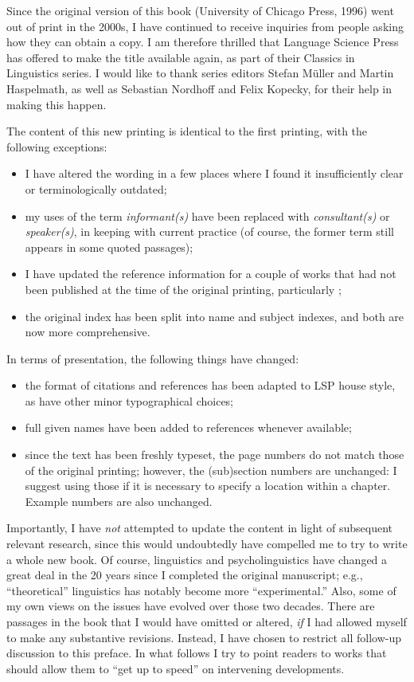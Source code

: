 \begin{refsection}
Since the original version of this book (University of Chicago Press, 1996) went out of print in the 2000s, I have continued to receive inquiries from people asking how they can obtain a copy. I am therefore thrilled that Language Science Press has offered to make the title available again, as part of their Classics in Linguistics series. I would like to thank series editors Stefan Müller and Martin Haspelmath, as well as Sebastian Nordhoff and Felix Kopecky, for their help in making this happen.

The content of this new printing is identical to the first printing, with the following exceptions:
\begin{itemize}
\item I have altered the wording in a few places where I found it insufficiently clear or terminologically outdated;
\item my uses of the term \textit{informant(s)} have been replaced with \textit{consultant(s)} or \textit{speaker(s)}, in keeping with current practice (of course, the former term still appears in some quoted passages);
\item I have updated the reference information for a couple of works that had not been published at the time of the original printing, particularly \citet{Cowart1997};
\item the original index has been split into name and subject indexes, and both are now more comprehensive.
\end{itemize}

\noindent In terms of presentation, the following things have changed: 
\begin{itemize}
\item the format of citations and references has been adapted to LSP house style, as have other minor typographical choices;
\item full given names have been added to references whenever available;
\item since the text has been freshly typeset, the page numbers do not match those of the original printing; however, the (sub)section numbers are unchanged: I suggest using those if it is necessary to specify a location within a chapter. Example numbers are also unchanged.
\end{itemize}

Importantly, I have \textit{not} attempted to update the content in light of subsequent relevant research, since this would undoubtedly have compelled me to try to write a whole new book. Of course, linguistics and psycholinguistics have chang\-ed a great deal in the 20 years since I  completed the original manuscript; e.g., ``theoretical'' linguistics has notably become more ``experimental.'' Also, some of my own views on the issues have evolved over those two decades. There are passages in the book that I would have omitted or altered, \textit{if} I had allowed myself to make any substantive revisions. Instead, I have chosen to restrict all follow-up discussion to this preface. In what follows I try to point readers to works that should allow them to ``get up to speed'' on intervening developments.


\end{refsection}
